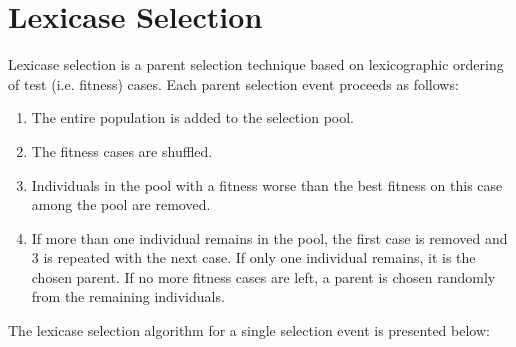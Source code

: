 \documentclass[preprint]{article}
\begin{document}
\section{Lexicase Selection}\label{s:2}
Lexicase selection is a parent selection technique based on lexicographic ordering of test (i.e. fitness) cases.  Each parent selection event proceeds as follows: 

\begin{enumerate}
\item The entire population is added to the selection pool.
\item The fitness cases are shuffled.
\item Individuals in the pool with a fitness worse than the best fitness on this case among the pool are removed. 
\item If more than one individual remains in the pool, the first case is removed and 3 is repeated with the next case. If only one individual remains, it is the chosen parent. If no more fitness cases are left, a parent is chosen randomly from the remaining individuals. 
\end{enumerate}

The lexicase selection algorithm for a single selection event is presented below: 
\end{document}
